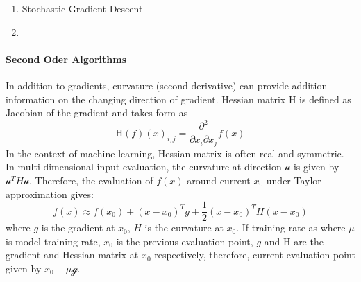 \begin{enumerate}
    \item Stochastic Gradient Descent \\
    \item \\
\end{enumerate}

\paragraph{Second Oder Algorithms}
In addition to gradients, curvature (second derivative) can provide addition information on the changing direction of gradient. Hessian matrix $\mathrm{H}$ is defined as Jacobian of the gradient and takes form as 
\begin{equation}
    \mathrm{H}(f)(x)_{i,j} = \frac{\partial^2}{\partial x_i \partial x_j}f(x)
\end{equation}
In the context of machine learning, Hessian matrix is often real and symmetric. In multi-dimensional input evaluation, the curvature at direction $\mathcal{u}$ is given by $\mathcal{u}^TH\mathcal{u}$. Therefore, the evaluation of $f(x)$ around current $x_0$ under Taylor approximation gives:
\begin{equation}
    \label{eq:TaylorEvaluation}
    f(x) \approx f(x_0)+(x-x_0)^Tg+\frac{1}{2}(x-x_0)^TH(x-x_0)
\end{equation}
where $g$ is the gradient at $x_0$, $H$ is the curvature at $x_0$. If training rate as 
where $\mu$ is model training rate, $x_0$ is the previous evaluation point, $g$ and $\mathrm{H}$ are the gradient and Hessian matrix at $x_0$ respectively, therefore, current evaluation point given by $x_0-\mu\mathcal{g}$.
